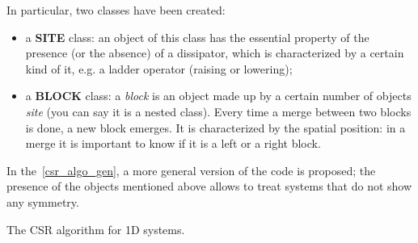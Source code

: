 In particular, two classes have been created:
\begin{itemize}
    \item a \textbf{SITE} class: an object of this class has the essential property of the presence (or the absence) of a dissipator, which is characterized by a certain kind of it, e.g. a ladder operator (raising or lowering);
    \item a \textbf{BLOCK} class: a \emph{block} is an object made up by a certain number of objects \emph{site} (you can say it is a nested class). Every time a merge between two blocks is done, a new block emerges. It is characterized by the spatial position: in a merge it is important to know if it is a left or a right block.
\end{itemize}
In the~\ref{csr_algo_gen}, a more general version of the code is proposed; the presence of the objects mentioned above allows to treat systems that do not show any symmetry.

\begin{algorithm}[H]
\label{csr_algo_gen}
\DontPrintSemicolon
\SetAlgoLined
{}
\smallskip
{}
\bigskip
{}

\caption{The CSR algorithm for 1D systems.}
\end{algorithm}

